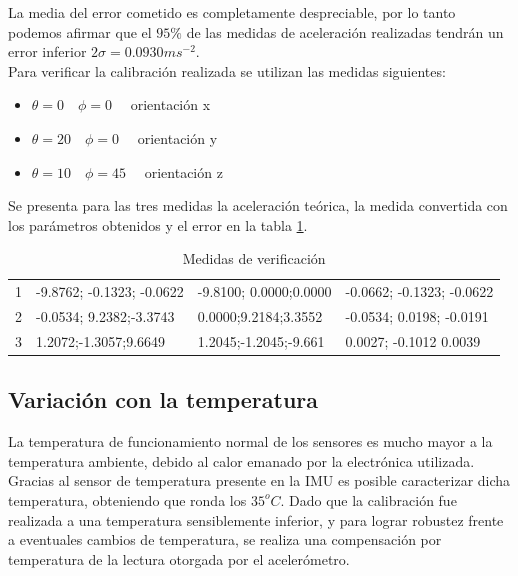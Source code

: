 \documentclass[main]{subfiles}
\begin{document}
La media del error cometido es completamente despreciable, por lo tanto podemos afirmar que el $95\% $ de las medidas de aceleración realizadas tendrán un error inferior $2\sigma=0.0930ms^{-2}$.\\
 
Para verificar la calibración realizada se utilizan las medidas siguientes:
\begin{itemize}
\item $\theta = 0 \quad \phi = 0 \quad$ orientación x
\item $\theta = 20 \quad \phi = 0 \quad$ orientación y
\item $\theta = 10 \quad \phi = 45 \quad$ orientación z
\end{itemize}

Se presenta para las tres medidas la aceleración teórica, la medida convertida con los parámetros obtenidos y el error en la tabla \ref{tab:diff}. 

\begin{table}[H]
\centering
\begin{tabular}{|p{90pt}|p{90pt}|p{90pt}|p{90pt}|}
\hline
\cellcolor[gray]{0.8}{Medida} & \cellcolor[gray]{0.8}{Aceleración Medida ($ms^{-2}$)}&\cellcolor[gray]{0.8}{Aceleración teórica($m^{-2}$)}& \cellcolor[gray]{0.8}{Error($ms^{-2}$)} \\
\hline
1 &  -9.8762; -0.1323; -0.0622   & -9.8100; 0.0000;0.0000     & -0.0662; -0.1323; -0.0622\\
\hline
2 & -0.0534; 9.2382;-3.3743       & 0.0000;9.2184;3.3552     & -0.0534; 0.0198; -0.0191\\
\hline
3 & 1.2072;-1.3057;9.6649       & 1.2045;-1.2045;-9.661   & 0.0027; -0.1012 0.0039\\
\hline
\end{tabular}
\caption{Medidas de verificación}
\label{tab:diff}
\end{table}


\subsection{Variación con la temperatura}

La temperatura de funcionamiento normal de los sensores es mucho mayor a la temperatura ambiente, debido al calor emanado por la electrónica utilizada. Gracias al sensor de temperatura presente en la IMU es posible caracterizar dicha temperatura, obteniendo que ronda los $35^oC$. Dado que la calibración fue realizada a una temperatura sensiblemente inferior, y para lograr robustez frente a eventuales cambios de temperatura, se realiza una compensación por temperatura de la lectura otorgada por el acelerómetro.\\
\end{document}
